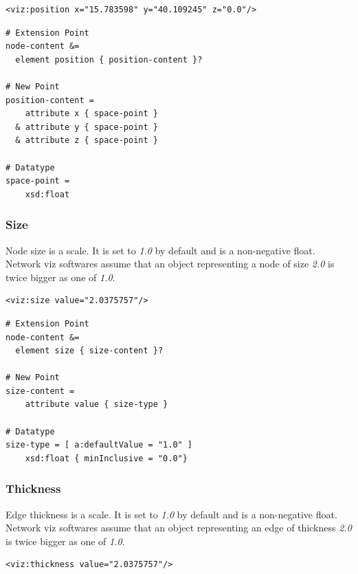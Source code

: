 \documentclass[a4paper,10pt]{article}
\begin{document}
\lstset{ style=gexf }
\begin{lstlisting}[caption={VIZ Position Declaration},label=vizposition]
<viz:position x="15.783598" y="40.109245" z="0.0"/>
\end{lstlisting}

\lstset{ style=rnc }
\begin{lstlisting}[caption={Position Specification},label=positionRNC]
# Extension Point
node-content &=
  element position { position-content }?

# New Point
position-content =
    attribute x { space-point }
  & attribute y { space-point }
  & attribute z { space-point }

# Datatype
space-point =
    xsd:float
\end{lstlisting}

\subsubsection{Size}

Node size is a scale. It is set to \textit{1.0} by default and is a non-negative float. Network viz softwares assume that an object representing a node of size \textit{2.0} is twice bigger as one of \textit{1.0}.

\lstset{ style=gexf }
\begin{lstlisting}[caption={VIZ Size Declaration},label=vizsize]
<viz:size value="2.0375757"/>
\end{lstlisting}

\lstset{ style=rnc }
\begin{lstlisting}[caption={Size Specification},label=sizeRNC]
# Extension Point
node-content &=
  element size { size-content }?

# New Point
size-content =
    attribute value { size-type }

# Datatype
size-type = [ a:defaultValue = "1.0" ]
    xsd:float { minInclusive = "0.0"}
\end{lstlisting}

\subsubsection{Thickness}

Edge thickness is a scale. It is set to \textit{1.0} by default and is a non-negative float. Network viz softwares assume that an object representing an edge of thickness \textit{2.0} is twice bigger as one of \textit{1.0}.

\lstset{ style=gexf }
\begin{lstlisting}[caption={VIZ Thickness Declaration},label=vizthickness]
<viz:thickness value="2.0375757"/>
\end{lstlisting}
\end{document}
